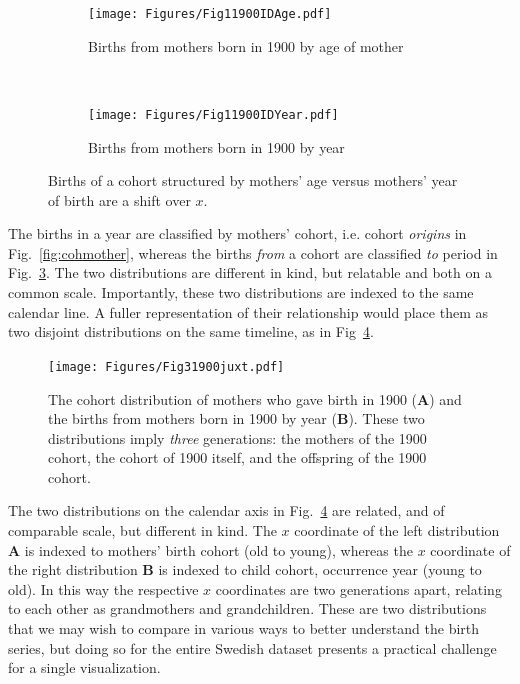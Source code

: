 \begin{figure}[ht!]
\begin{subfigure}[t]{0.5\textwidth}
        \centering
        \texttt{[image: Figures/Fig11900IDAge.pdf]}
        \caption{Births from mothers born in 1900 by age of mother}
        \label{fig:age1900mother}
\end{subfigure}
~
\begin{subfigure}[t]{0.5\textwidth}
        \centering
        \texttt{[image: Figures/Fig11900IDYear.pdf]}
        \caption{Births from mothers born in 1900 by year}
          \label{fig:year1900}
\end{subfigure}
\caption{Births of a cohort structured by mothers' age versus mothers' year of birth are a shift over $x$. }
\end{figure}

The births in a year are classified by mothers' cohort, i.e. cohort \emph{origins} in Fig.~\ref{fig:cohmother}, whereas the births \emph{from} a cohort are classified \emph{to} period in Fig.~\ref{fig:year1900}. The two distributions are different in kind, but relatable and both on a common scale. Importantly, these two distributions are indexed to the same calendar line. A fuller representation of their relationship would place them as two disjoint distributions on the same timeline, as in Fig~\ref{fig:juxt}.

\begin{figure}[ht!]
 \centering
        \texttt{[image: Figures/Fig31900juxt.pdf]}
        \caption{The cohort distribution of mothers who gave birth in 1900 (\textbf{A}) and the births from mothers born in 1900 by year (\textbf{B}). These two distributions imply \emph{three} generations: the mothers of the 1900 cohort, the cohort of 1900 itself, and the offspring of the 1900 cohort.}
          \label{fig:juxt}
\end{figure}

The two distributions on the calendar axis in Fig.~\ref{fig:juxt} are related, and of comparable scale, but different in kind. The $x$ coordinate of the left distribution \textbf{A} is indexed to mothers' birth cohort (old to young), whereas the $x$ coordinate of the right distribution \textbf{B} is indexed to child cohort, occurrence year (young to old). In this way the respective $x$ coordinates are two generations apart, relating to each other as grandmothers and grandchildren. These are two distributions that we may wish to compare in various ways to better understand the birth series, but doing so for the entire Swedish dataset presents a practical challenge for a single visualization. 

